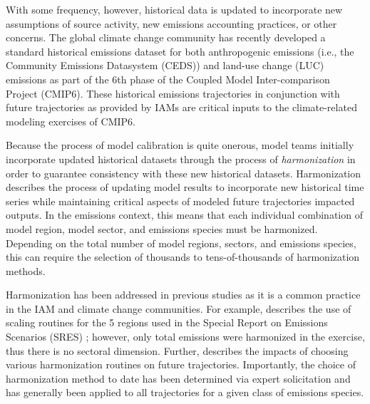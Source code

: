 With some frequency, however, historical data is updated to incorporate new
assumptions of source activity, new emissions accounting practices, or other
concerns. The global climate change community has recently developed a standard
historical emissions dataset for both anthropogenic emissions (i.e., the
Community Emissions Datasystem (CEDS)) \cite{hoesly_historical_2017} and
land-use change (LUC) emissions \cite{van_marle_historic_2017} as part of the
6th phase of the Coupled Model Inter-comparison Project (CMIP6). These
historical emissions trajectories in conjunction with future trajectories as
provided by IAMs are critical inputs to the climate-related modeling exercises
of CMIP6.

Because the process of model calibration is quite onerous, model teams initially
incorporate updated historical datasets through the process of
\textit{harmonization} in order to guarantee consistency with these new
historical datasets. Harmonization describes the process of updating model
results to incorporate new historical time series while maintaining critical
aspects of modeled future trajectories impacted outputs. In the emissions
context, this means that each individual combination of model region, model
sector, and emissions species must be harmonized. Depending on the total number
of model regions, sectors, and emissions species, this can require the selection
of thousands to tens-of-thousands of harmonization methods.

Harmonization has been addressed in previous studies as it is a common practice
in the IAM and climate change communities. For example,
\cite{meinshausen_rcp_2011} describes the use of scaling routines for the 5
regions used in the Special Report on Emissions Scenarios (SRES)
\cite{nakicenovic2000}; however, only total emissions were harmonized in the
exercise, thus there is no sectoral dimension. Further,
\cite{rogelj_discrepancies_2011} describes the impacts of choosing various
harmonization routines on future trajectories. Importantly, the choice of
harmonization method to date has been determined via expert solicitation and has
generally been applied to all trajectories for a given class of emissions
species.


